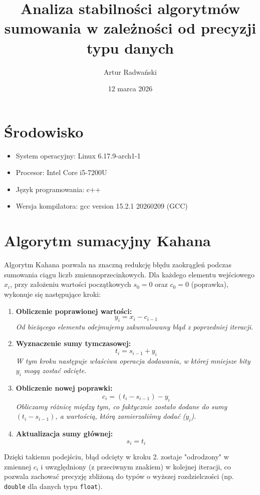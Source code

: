 \documentclass{article}
\title{Analiza stabilności algorytmów sumowania w zależności od precyzji typu danych}
\author{Artur Radwański}
\date{12 marca 2026}
\begin{document}
\maketitle

\section{Środowisko}
\begin{itemize}
    \item System operacyjny: Linux 6.17.9-arch1-1
    \item Procesor: Intel Core i5-7200U
    \item Język programowania: c++ 
    \item Wersja kompilatora: gcc version 15.2.1 20260209 (GCC)
\end{itemize}

\section{Algorytm sumacyjny Kahana}

Algorytm Kahana pozwala na znaczną redukcję błędu zaokrągleń podczas sumowania ciągu liczb zmiennoprzecinkowych. Dla każdego elementu wejściowego $x_i$, przy założeniu wartości początkowych $s_0 = 0$ oraz $c_0 = 0$ (poprawka), wykonuje się następujące kroki:

\begin{enumerate}
    \item \textbf{Obliczenie poprawionej wartości:}
    \[ y_i = x_i - c_{i-1} \]
    \textit{Od bieżącego elementu odejmujemy zakumulowany błąd z poprzedniej iteracji.}

    \item \textbf{Wyznaczenie sumy tymczasowej:}
    \[ t_i = s_{i-1} + y_i \]
    \textit{W tym kroku następuje właściwa operacja dodawania, w której mniejsze bity $y_i$ mogą zostać odcięte.}

    \item \textbf{Obliczenie nowej poprawki:}
    \[ c_i = (t_i - s_{i-1}) - y_i \]
    \textit{Obliczamy różnicę między tym, co faktycznie zostało dodane do sumy $(t_i - s_{i-1})$, a wartością, którą zamierzaliśmy dodać ($y_i$).}

    \item \textbf{Aktualizacja sumy głównej:}
    \[ s_i = t_i \]
\end{enumerate}

Dzięki takiemu podejściu, błąd odcięty w kroku 2. zostaje "odrodzony" w zmiennej $c_i$ i uwzględniony (z przeciwnym znakiem) w kolejnej iteracji, co pozwala zachować precyzję zbliżoną do typów o wyższej rozdzielczości (np. \texttt{double} dla danych typu \texttt{float}).
\end{document}
